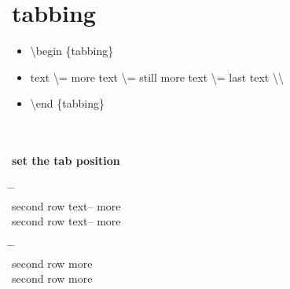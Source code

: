 
\section{tabbing}


		\begin{boxedminipage}[c,fboxrule=10pt,fboxsep=12pt]{1.0\linewidth}
		\begin{itemize}
		\item[]	\textbackslash begin \{tabbing\}
		\item[]	text \textbackslash = more text \textbackslash = still more text \textbackslash = last text \textbackslash\textbackslash 
		\item[]	\textbackslash end \{tabbing\}
		\end{itemize}
		\end{boxedminipage} \\


		\paragraph{set the tab position}


		\begin{tabbing}
		\hspace{2cm}	\= \hspace{2cm}	\= \hspace{2cm}	\\
		second row 	\> text-- 	\> more \\
		second row 	\> text-- 	\> more \\
		\end{tabbing}

		\begin{tabbing}
		\hspace{2cm}	\=\hspace{2cm}	\=\hspace{2cm}\\
		second row 	\>  		\> more \\
		second row 	\>  		\> more \\
		\end{tabbing}

